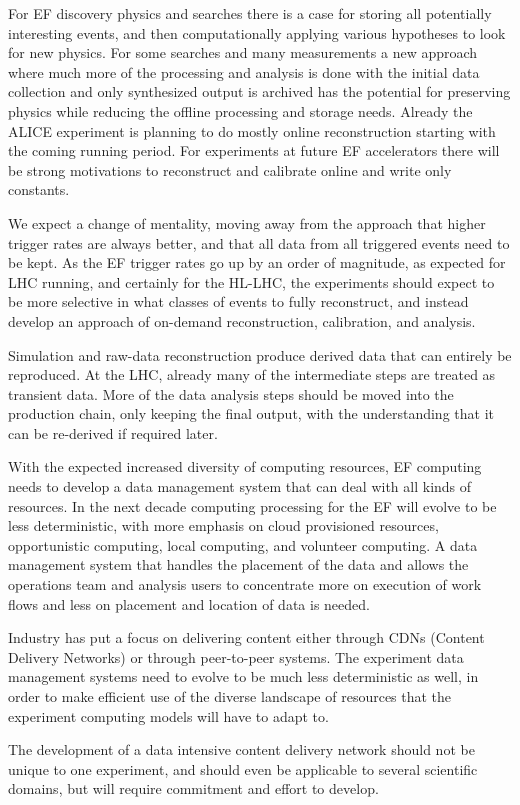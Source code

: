 For EF discovery physics and searches there is a case for storing all
potentially interesting events, and then computationally  applying various
hypotheses to look for new physics.  For some searches and many measurements a
new approach where much more of the processing and analysis is done with the
initial data collection and only synthesized output is archived has the
potential for preserving physics while reducing the offline processing and
storage needs.  Already the ALICE experiment is planning to do mostly online
reconstruction starting with  the coming running period.   For experiments at
future EF accelerators there will be strong motivations to reconstruct and
calibrate online and write only constants.

We expect a change of mentality, moving away from the approach that higher
trigger rates are always better, and that all data from  all triggered events
need to be kept.   As the EF trigger rates go up by an order of magnitude,  as
expected for LHC running, and certainly for the HL-LHC,  the experiments
should expect to be more selective in what classes of events to fully
reconstruct,  and instead develop an approach of on-demand reconstruction,
calibration, and analysis.

Simulation and raw-data reconstruction produce derived data that can
entirely be reproduced. At the LHC, already many of the intermediate steps are
treated as transient data.   More of the data analysis steps should be moved
into the production chain, only keeping the final output, with the
understanding that it can be re-derived if required later.

With the expected increased diversity of computing resources, EF computing
needs to develop a data management system that can deal with all kinds of
resources.   In the next decade computing processing for the EF will evolve to
be less deterministic, with more emphasis on cloud provisioned resources,
opportunistic computing, local computing, and volunteer computing.   A data
management system that handles the placement of the data and allows the
operations team and analysis users to concentrate more on execution of work
flows and less on placement and location of data is needed.

Industry has put a focus on delivering content either through CDNs (Content
Delivery Networks)  or through peer-to-peer systems.  The experiment data
management systems need to evolve to be much less deterministic as well, in
order to make efficient use of the diverse landscape of resources that the
experiment computing models will have to adapt to.

The development of a data intensive content delivery network should not be
unique to one experiment, and should even be applicable to several scientific
domains, but will require commitment and effort to develop.


